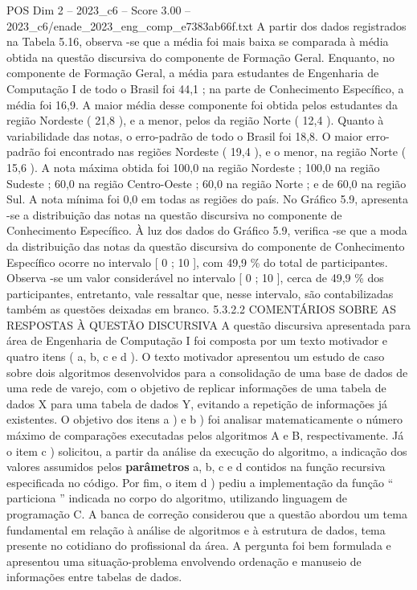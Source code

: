 \begin{textsample}{POS Dim 2 – 2023\_c6 – Score 3.00 – 2023\_c6/enade\_2023\_eng\_comp\_e7383ab66f.txt}
A partir dos dados registrados na Tabela 5.16, observa -se que a média foi mais baixa se comparada à média obtida na questão discursiva do componente de Formação Geral.
Enquanto, no componente de Formação Geral, a média para estudantes de Engenharia de Computação I de todo o Brasil foi 44,1 ; na parte de Conhecimento Específico, a média foi 16,9.
A maior média desse componente foi obtida pelos estudantes da região Nordeste ( 21,8 ), e a menor, pelos da região Norte ( 12,4 ).
Quanto à variabilidade das notas, o erro-padrão de todo o Brasil foi 18,8.
O maior erro-padrão foi encontrado nas regiões Nordeste ( 19,4 ), e o menor, na região Norte ( 15,6 ).
A nota máxima obtida foi 100,0 na região Nordeste ; 100,0 na região Sudeste ; 60,0 na região Centro-Oeste ; 60,0 na região Norte ; e de 60,0 na região Sul.
A nota mínima foi 0,0 em todas as regiões do país.
No Gráfico 5.9, apresenta -se a distribuição das notas na questão discursiva no componente de Conhecimento Específico.
À luz dos dados do Gráfico 5.9, verifica -se que a moda da distribuição das notas da questão discursiva do componente de Conhecimento Específico ocorre no intervalo [ 0 ; 10 ], com 49,9 \% do total de participantes.
Observa -se um valor considerável no intervalo [ 0 ; 10 ], cerca de 49,9 \% dos participantes, entretanto, vale ressaltar que, nesse intervalo, são contabilizadas também as questões deixadas em branco. 5.3.2.2 COMENTÁRIOS SOBRE AS RESPOSTAS À QUESTÃO DISCURSIVA A questão discursiva apresentada para área de Engenharia de Computação I foi composta por um texto motivador e quatro itens ( a, b, c e d ).
O texto motivador apresentou um estudo de caso sobre dois algoritmos desenvolvidos para a consolidação de uma base de dados de uma rede de varejo, com o objetivo de replicar informações de uma tabela de dados X para uma tabela de dados Y, evitando a repetição de informações já existentes.
O objetivo dos itens a ) e b ) foi analisar matematicamente o número máximo de comparações executadas pelos algoritmos A e B, respectivamente.
Já o item c ) solicitou, a partir da análise da execução do algoritmo, a indicação dos valores assumidos pelos \textbf{parâmetros} a, b, c e d contidos na função recursiva especificada no código.
Por fim, o item d ) pediu a implementação da função “ particiona ” indicada no corpo do algoritmo, utilizando linguagem de programação C.
A banca de correção considerou que a questão abordou um tema fundamental em relação à análise de algoritmos e à estrutura de dados, tema presente no cotidiano do profissional da área.
A pergunta foi bem formulada e apresentou uma situação-problema envolvendo ordenação e manuseio de informações entre tabelas de dados.

\end{textsample}
